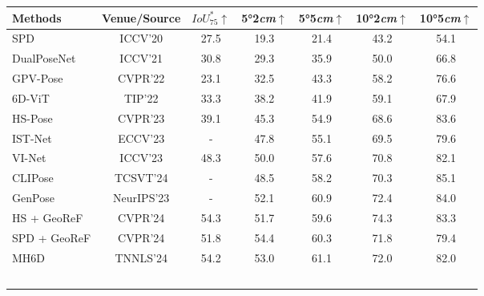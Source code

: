\begin{table*}[htbp]
    \small
    \centering
    \setlength\tabcolsep{8pt}%
    \begin{tabular}{l|c|c|cccc}
    \toprule%
     Methods & Venue/Source & $IoU_{75}^*$$\uparrow$ & 5°2\emph{cm}$\uparrow$ & 5°5\emph{cm}$\uparrow$ & 10°2\emph{cm}$\uparrow$ & 10°5\emph{cm}$\uparrow$ \\
    \midrule%
    SPD\cite{tian2020shape}     &  ICCV'20       & 27.5        & 19.3         & 21.4        & 43.2       & 54.1                     \\
    DualPoseNet\cite{lin2021dualposenet}   &  ICCV'21     & 30.8        & 29.3         & 35.9        & 50.0       & 66.8               \\
    GPV-Pose\cite{di2022gpv}    &   CVPR'22   & 23.1         & 32.5 & 43.3         & 58.2 & 76.6                                          \\
    6D-ViT\cite{zou20226d}    &  TIP'22     & 33.3         & 38.2 & 41.9         & 59.1 & 67.9          \\
    HS-Pose\cite{zheng2023hs}    &   CVPR'23      &39.1       & 45.3          &54.9         & 68.6         & 83.6       \\
    IST-Net\cite{liu2023net}    &  ECCV'23       &-       & 47.8         &55.1        & 69.5        & 79.6      \\
    VI-Net\cite{lin2023vi}    &   ICCV'23        &48.3       & 50.0          &57.6         & 70.8        & 82.1     \\
    CLIPose\cite{lin2024clipose}  &   TCSVT'24   & - & 48.5         & 58.2 & 70.3 & 85.1 \\
    GenPose\cite{zhang2023genpose}    &   NeurIPS'23    &-       & 52.1          &60.9         & 72.4        & 84.0      \\
    HS + GeoReF\cite{zheng2024georef}    &   CVPR'24     &54.3       & 51.7          &59.6         & 74.3        & 83.3      \\
    SPD + GeoReF\cite{zheng2024georef}    &   CVPR'24     &51.8       & 54.4          &60.3         & 71.8       & 79.4       \\
    MH6D\cite{liu2024mh6d}    &   TNNLS'24       &54.2       & 53.0          &61.1         & 72.0       & 82.0      \\
$$
\end{tabular}
\end{table*}
